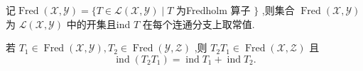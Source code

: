 \documentclass[lang=cn,newtx,10pt,scheme=chinese,thmcnt=chapter]{elegantbook}
\begin{document}
\begin{corollary}
    记\(\operatorname{Fred}\left( {\mathcal{X},\mathcal{Y}}\right)  = \{ T \in  \mathcal{L}\left( {\mathcal{X},\mathcal{Y}}\right)  \mid  T\) 为Fredholm 算子 \(\}\) ,则集合 \(\operatorname{Fred}\left( {\mathcal{X},\mathcal{Y}}\right)\) 为 \(\mathcal{L}\left( {\mathcal{X},\mathcal{Y}}\right)\) 中的开集且ind \(T\) 在每个连通分支上取常值.
\end{corollary}

\begin{corollary}
    若 \({T}_{1} \in  \operatorname{Fred}\left( {\mathcal{X},\mathcal{Y}}\right) ,{T}_{2} \in  \operatorname{Fred}\left( {\mathcal{Y},\mathcal{Z}}\right)\) ,则 \({T}_{2}{T}_{1} \in  \operatorname{Fred}\left( {\mathcal{X},\mathcal{Z}}\right)\) 且
\begin{equation*}
\operatorname{ind}\left( {{T}_{2}{T}_{1}}\right)  = \operatorname{ind}{T}_{1} + \operatorname{ind}{T}_{2}.
\end{equation*}

\end{corollary}
\end{document}
